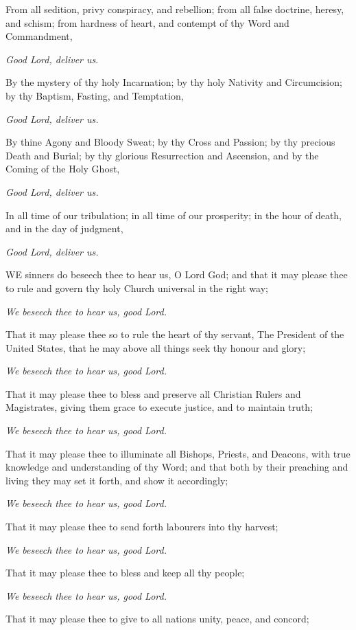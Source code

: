 From all sedition, privy conspiracy, and rebellion;
from all false doctrine, heresy, and schism; from hardness of heart, and
contempt of thy Word and Commandment, 

\emph{Good Lord, deliver us}.

By the mystery of thy holy Incarnation; by thy holy
Nativity and Circumcision; by thy Baptism, Fasting, and Temptation, 

\emph{Good Lord, deliver us.}

By thine Agony and Bloody Sweat; by thy Cross and Passion;
by thy precious Death and Burial; by thy glorious Resurrection and Ascension,
and by the Coming of the Holy Ghost, 

\emph{Good Lord, deliver us.}

In all time of our tribulation; in all time of our
prosperity; in the hour of death, and in the day of judgment, 

\emph{Good Lord, deliver us.}

WE
sinners do beseech thee to hear us, O Lord God; and that it may please
thee to rule and govern thy holy Church universal in the right way; 

\emph{We beseech thee to hear us, good Lord.}

That it may please thee so to rule the heart of thy
servant, The President of the United States, that he may above all things
seek thy honour and glory; 

\emph{We beseech thee to hear us, good Lord.}

That it may please thee to bless and preserve all Christian
Rulers and Magistrates, giving them grace to execute justice, and to maintain
truth; 

\emph{We beseech thee to hear us, good Lord.}

That it may please thee to illuminate all Bishops,
Priests, and Deacons, with true knowledge and understanding of thy Word;
and that both by their preaching and living they may set it forth, and
show it accordingly; 

\emph{We beseech thee to hear us, good Lord.}

That it may please thee to send forth labourers into
thy harvest; 

\emph{We beseech thee to hear us, good Lord.}

That it may please thee to bless and keep all thy people; 

\emph{We beseech thee to hear us, good Lord.}

That it may please thee to give to all nations unity, peace, and concord;

